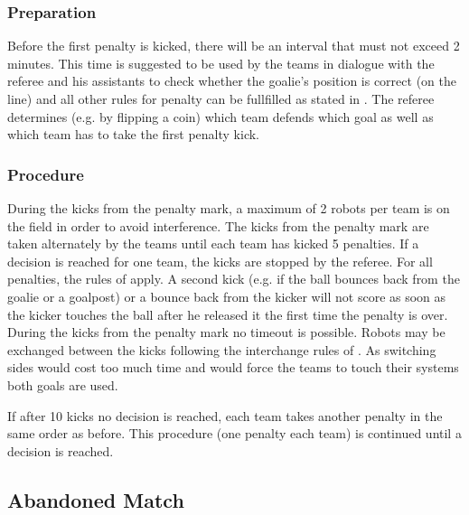\subsubsection{Preparation}
Before the first penalty is kicked, there will be an interval that must not exceed 2 minutes.
This time is suggested to be used by the teams in dialogue with the referee and his assistants to check whether the goalie's position is correct (on the line) and all other rules for penalty can be fullfilled as stated in .
The referee determines (e.g.\added{,} by flipping a coin) which team defends which goal as well as which team has to take the first penalty kick.

\subsubsection{Procedure}
During the kicks from the penalty mark, a maximum of 2 robots per team is on the field in order to avoid interference.
The kicks from the penalty mark are taken alternately by the teams until each team has kicked 5 penalties.
If a decision is reached for one team, the kicks are stopped by the referee.
For all penalties, the rules of  apply.
A second kick (e.g.\added{,} if the ball bounces back from the goalie or a goalpost) or a bounce back from the kicker will not score\removed{,}\added{;} as soon as the kicker touches the ball after he released it the first time the penalty is over.
During the kicks from the penalty mark no timeout is possible.
Robots may be exchanged between the kicks following the interchange rules of .
As switching sides would cost too much time and would force the teams to touch their systems both goals are used.

If after 10 kicks no decision is reached, each team takes another penalty in the same order as before.
This procedure (one penalty each team) is continued until a decision is reached.

\subsection{Abandoned Match}

